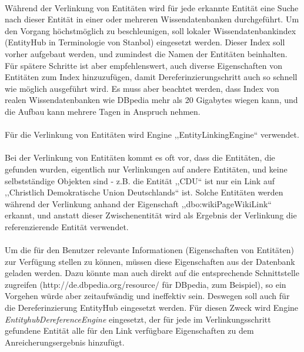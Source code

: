 \paragraph{}  
Während der Verlinkung von Entitäten wird für jede erkannte Entität eine Suche nach dieser Entität in einer oder mehreren Wissendatenbanken durchgeführt. Um den Vorgang höchstmöglich zu beschleunigen, soll lokaler Wissendatenbankindex (EntityHub in Terminologie von Stanbol) eingesetzt werden. Dieser Index soll vorher aufgebaut werden, und zumindest die Namen der Entitäten beinhalten. Für spätere Schritte ist aber empfehlenswert, auch diverse Eigenschaften von Entitäten zum Index hinzuzufügen, damit Dereferinzierungschritt auch so schnell wie möglich ausgeführt wird. Es muss aber beachtet werden, dass Index von realen Wissendatenbanken wie DBpedia mehr als 20 Gigabytes wiegen kann, und die Aufbau kann mehrere Tagen in Anspruch nehmen.

\paragraph{}
Für die Verlinkung von Entitäten wird Engine ,,EntityLinkingEngine`` verwendet. 

\paragraph{}
Bei der Verlinkung von Entitäten kommt es oft vor, dass die Entitäten, die gefunden wurden, eigentlich nur Verlinkungen auf andere Entitäten, und keine selbstständige Objekten sind - z.B. die Entität ,,CDU`` ist nur ein Link auf ,,Christlich Demokratische Union Deutschlands`` ist. Solche Entitäten werden während der Verlinkung anhand der Eigenschaft ,,dbo:wikiPageWikiLink`` erkannt, und anstatt dieser Zwischenentität wird als Ergebnis der Verlinkung die referenzierende Entität verwendet.

\paragraph{}
Um die für den Benutzer relevante Informationen (Eigenschaften von Entitäten) zur Verfügung stellen zu können, müssen diese Eigenschaften aus der Datenbank geladen werden. Dazu könnte man auch direkt auf die entsprechende Schnittstelle zugreifen (http://de.dbpedia.org/resource/ für DBpedia, zum Beispiel), so ein Vorgehen würde aber zeitaufwändig und ineffektiv sein. Deswegen soll auch für die Dereferinzierung EntityHub eingesetzt werden. Für diesen Zweck wird Engine \textit{EntityhubDereferenceEngine} eingesetzt, der für jede im Verlinkungsschritt gefundene Entität alle für den Link verfügbare Eigenschaften zu dem Anreicherungsergebnis hinzufügt.

